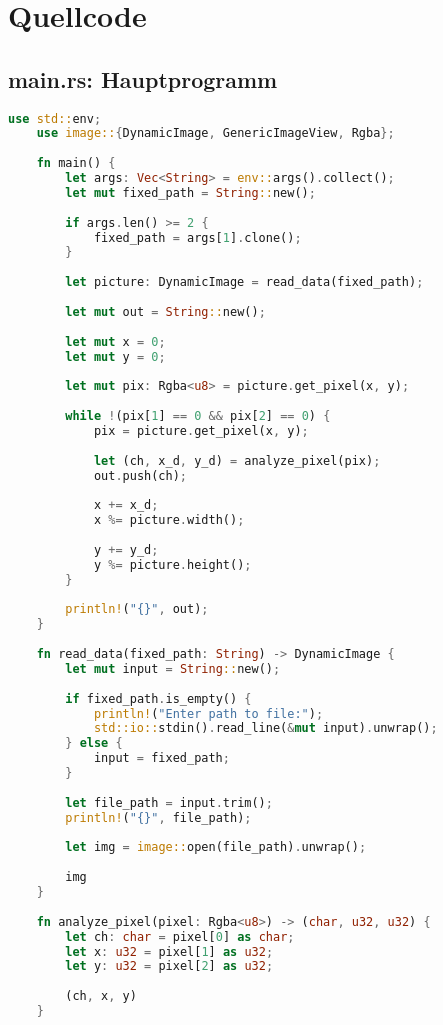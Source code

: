 \section{Quellcode}
\subsection{main.rs: Hauptprogramm}

\begin{lstlisting}[language=Rust, style=colouredRust]
    use std::env;
    use image::{DynamicImage, GenericImageView, Rgba};
    
    fn main() {
        let args: Vec<String> = env::args().collect();
        let mut fixed_path = String::new();
    
        if args.len() >= 2 {
            fixed_path = args[1].clone();
        }
    
        let picture: DynamicImage = read_data(fixed_path);
    
        let mut out = String::new();
    
        let mut x = 0;
        let mut y = 0;
    
        let mut pix: Rgba<u8> = picture.get_pixel(x, y);
    
        while !(pix[1] == 0 && pix[2] == 0) {
            pix = picture.get_pixel(x, y);
    
            let (ch, x_d, y_d) = analyze_pixel(pix);
            out.push(ch);
    
            x += x_d;
            x %= picture.width();
    
            y += y_d;
            y %= picture.height();
        }
    
        println!("{}", out);
    }
    
    fn read_data(fixed_path: String) -> DynamicImage {
        let mut input = String::new();
    
        if fixed_path.is_empty() {
            println!("Enter path to file:");
            std::io::stdin().read_line(&mut input).unwrap();
        } else {
            input = fixed_path;
        }
    
        let file_path = input.trim();
        println!("{}", file_path);
    
        let img = image::open(file_path).unwrap();
    
        img
    }
    
    fn analyze_pixel(pixel: Rgba<u8>) -> (char, u32, u32) {
        let ch: char = pixel[0] as char;
        let x: u32 = pixel[1] as u32;
        let y: u32 = pixel[2] as u32;
    
        (ch, x, y)
    }
     
\end{lstlisting}
